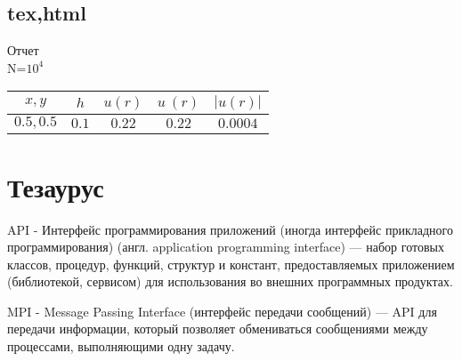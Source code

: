 \section{tex,html}
\begin{center}
Отчет \\
N=$10^{4} $ \\
\begin{tabular}{|c|c|c|c|c|}
\hline
\textbf{$x,y$} & {\textbf{$h$}}& {\textbf{$u(r)$}}& {\textbf{$u^{~}(r)$}}& {\textbf{$|u(r)|$}}\\ \hline
\textbf{$0.5,0.5$} & {\textbf{$0.1$}}& {\textbf{$0.22$}}& {\textbf{$0.22$}}& {\textbf{$0.0004$}}\\ \hline
\end{tabular}
\end{center}
\chapter{Тезаурус}
API - Интерфейс программирования приложений (иногда интерфейс прикладного программирования) (англ. application programming interface) — набор готовых классов, процедур, функций, структур и констант, предоставляемых приложением (библиотекой, сервисом) для использования во внешних программных продуктах. 

MPI - Message Passing Interface (интерфейс передачи сообщений) — API для передачи информации, который позволяет обмениваться сообщениями между процессами, выполняющими одну задачу.
